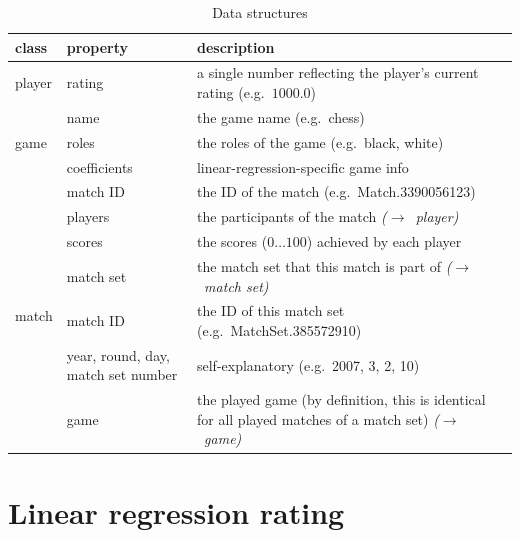 \documentclass[a4paper,10pt]{article}
\begin{document}
\begin{table}
\begin{center}
\begin{tabular}{l m{2.8cm} m{6cm}}
\hline
\textbf{class} & \textbf{property} & \textbf{description} \\
\hline
player & rating & a single number reflecting the player's current rating (e.g.\ $1000.0$) \\ 
\hline
\multirow{3}{*}{game} & name & the game name (e.g.\ chess) \\ 
 & roles & the roles of the game (e.g.\ black, white) \\ 
 & coefficients &  linear-regression-specific game info \\
\hline
\multirow{7}{*}{match} & match ID & the ID of the match (e.g.\ Match.3390056123) \\ 
 & players & the participants of the match \textit{($\rightarrow$~player)} \\ 
 & scores & the scores ($0 \dotsc 100$) achieved by each player\\ 
 & match set & the match set that this match is part of \textit{($\rightarrow$~match set)} \\ 
\hline
\multirow{6}{*}{match set} & match ID & the ID of this match set (e.g.\ MatchSet.385572910) \\ 
 & year, round, day, match set number & self-explanatory (e.g.\ 2007, 3, 2, 10) \\ 
 & game & the played game (by definition, this is identical for all played matches of a match set) \textit{($\rightarrow$~game)} \\
\hline
\end{tabular}
\end{center}
\caption{Data structures}
\label{tab:data_structures}
\end{table} 

\section{Linear regression rating}
\end{document}
